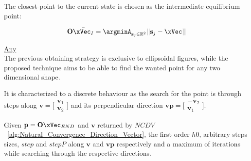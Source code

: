 The closest-point to the current state is chosen as the intermediate equilibrium point:

\begin{equation}
    \mathbf{O}\bar{\xVec_I} = \argminA_{\mathbf{s}_j \in \mathbb{R}^2} ||\mathbf{s}_j - \xVec|| 
    \label{eq:Intermediate_Equilibrium_Point}
\end{equation}


\underline{Any}
\label{sssec:Constraint_Tangent_Point_Any} \\


The previous obtaining strategy is exclusive to ellipsoidal figures, while the proposed  technique aims to be able to find the wanted point for any two dimensional shape. \par 
It is characterized to a discrete behaviour as the search for the point is through steps along \(\mathbf{v} = \bigl[\begin{smallmatrix} \mathbf{v}_1 \\ \mathbf{v}_2 \end{smallmatrix}\bigr]\) and its perpendicular direction \(\mathbf{vp} = \bigl[\begin{smallmatrix} -\mathbf{v}_2 \\ \mathbf{v}_1 \end{smallmatrix}\bigr]\).  \par
Given \(\mathbf{p} = \mathbf{O}\xVec_{END}\) and \(\mathbf{v}\) returned by \(NCDV\)~\ref{alg:Natural_Convergence_Direction_Vector}, the first order  \(h0\), arbitrary  steps sizes, \(step\) and \(stepP\) along \(\mathbf{v}\) and \(\mathbf{vp}\) respectively and a maximum of iterations while searching through the respective directions. 

\newpage %

